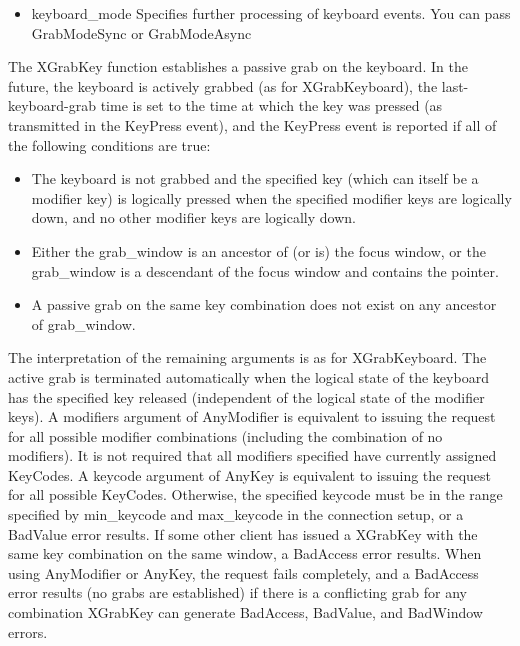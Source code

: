 \documentclass{report}
\begin{document}
\begin{itemize}
\begin{itemize}
                \item keyboard\_mode Specifies further processing of keyboard events. You can pass GrabModeSync or GrabModeAsync
            \end{itemize}
            The XGrabKey function establishes a passive grab on the keyboard. In the future, the keyboard is actively grabbed (as for XGrabKeyboard), the last-keyboard-grab time is set to the time at which the key was pressed (as transmitted in the KeyPress event), and the KeyPress event is reported if all of the following conditions are true:
            \begin{itemize}
                \item The keyboard is not grabbed and the specified key (which can itself be a modifier key) is logically pressed when the specified modifier keys are logically down, and no other modifier keys are logically down.
                \item Either the grab\_window is an ancestor of (or is) the focus window, or the grab\_window is a descendant of the focus window and contains the pointer.
                \item A passive grab on the same key combination does not exist on any ancestor of grab\_window.
            \end{itemize}
            The interpretation of the remaining arguments is as for XGrabKeyboard. The active grab is terminated automatically when the logical state of the keyboard has the specified key released (independent of the logical state of the modifier keys).
            \bigbreak \noindent 
            A modifiers argument of AnyModifier is equivalent to issuing the request for all possible modifier combinations (including the combination of no modifiers). It is not required that all modifiers specified have currently assigned KeyCodes. A keycode argument of AnyKey is equivalent to issuing the request for all possible KeyCodes. Otherwise, the specified keycode must be in the range specified by min\_keycode and max\_keycode in the connection setup, or a BadValue error results.
            \bigbreak \noindent 
            If some other client has issued a XGrabKey with the same key combination on the same window, a BadAccess error results. When using AnyModifier or AnyKey, the request fails completely, and a BadAccess error results (no grabs are established) if there is a conflicting grab for any combination
            \bigbreak \noindent 
            XGrabKey can generate BadAccess, BadValue, and BadWindow errors.
            \bigbreak \noindent 

\end{itemize}
\end{document}
